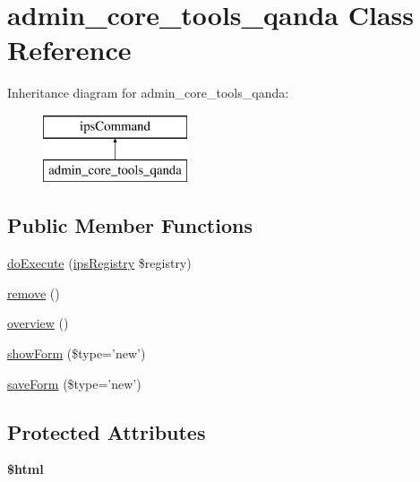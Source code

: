 \hypertarget{classadmin__core__tools__qanda}{\section{admin\-\_\-core\-\_\-tools\-\_\-qanda Class Reference}
\label{classadmin__core__tools__qanda}
}
Inheritance diagram for admin\-\_\-core\-\_\-tools\-\_\-qanda\-:\begin{figure}[H]
\begin{center}
\leavevmode
\includegraphics[height=2.000000cm]{classadmin__core__tools__qanda}
\end{center}
\end{figure}
\subsection*{Public Member Functions}
\begin{DoxyCompactItemize}
\item 
\hyperlink{classadmin__core__tools__qanda_afbc4e912a0604b94d47d66744c64d8ba}{do\-Execute} (\hyperlink{classips_registry}{ips\-Registry} \$registry)
\item 
\hyperlink{classadmin__core__tools__qanda_aff9a1fb07dca963c2c9a8ffe66b45ded}{remove} ()
\item 
\hyperlink{classadmin__core__tools__qanda_a605d77b075a42b540e2fa25bc3db9045}{overview} ()
\item 
\hyperlink{classadmin__core__tools__qanda_ac7c6ead82c13ec36f26a6a80ef266d5b}{show\-Form} (\$type='new')
\item 
\hyperlink{classadmin__core__tools__qanda_a6f551c1f0f06fa0c4ebc0dc211f9f1ed}{save\-Form} (\$type='new')
\end{DoxyCompactItemize}
\subsection*{Protected Attributes}
\begin{DoxyCompactItemize}
\item 
\hypertarget{classadmin__core__tools__qanda_a6f96e7fc92441776c9d1cd3386663b40}{{\bfseries \$html}}\label{classadmin__core__tools__qanda_a6f96e7fc92441776c9d1cd3386663b40}

\end{DoxyCompactItemize}
